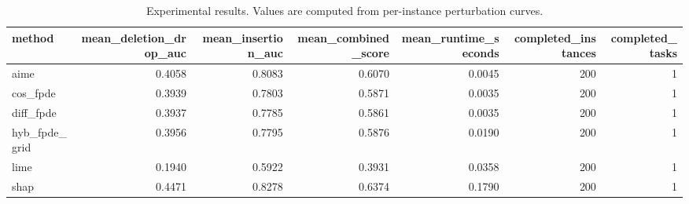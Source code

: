 \begin{table}[t]
\caption{Experimental results. Values are computed from per-instance perturbation curves.}
\label{tab:main_results_computed}
\centering
\begin{tabular}{lrrrrrr}
\toprule
method & mean\_deletion\_drop\_auc & mean\_insertion\_auc & mean\_combined\_score & mean\_runtime\_seconds & completed\_instances & completed\_tasks \\
\midrule
aime & 0.4058 & 0.8083 & 0.6070 & 0.0045 & 200 & 1 \\
cos\_fpde & 0.3939 & 0.7803 & 0.5871 & 0.0035 & 200 & 1 \\
diff\_fpde & 0.3937 & 0.7785 & 0.5861 & 0.0035 & 200 & 1 \\
hyb\_fpde\_grid & 0.3956 & 0.7795 & 0.5876 & 0.0190 & 200 & 1 \\
lime & 0.1940 & 0.5922 & 0.3931 & 0.0358 & 200 & 1 \\
shap & 0.4471 & 0.8278 & 0.6374 & 0.1790 & 200 & 1 \\
\bottomrule
\end{tabular}

\end{table}
